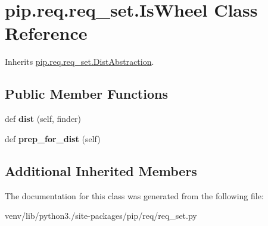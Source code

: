 \hypertarget{classpip_1_1req_1_1req__set_1_1_is_wheel}{}\section{pip.\+req.\+req\+\_\+set.\+Is\+Wheel Class Reference}
\label{classpip_1_1req_1_1req__set_1_1_is_wheel}


Inherits \hyperlink{classpip_1_1req_1_1req__set_1_1_dist_abstraction}{pip.\+req.\+req\+\_\+set.\+Dist\+Abstraction}.

\subsection*{Public Member Functions}
\begin{DoxyCompactItemize}
\item 
\mbox{\label{classpip_1_1req_1_1req__set_1_1_is_wheel_ad3756925831931114fad731e467bf9d8}} 
def {\bfseries dist} (self, finder)
\item 
\mbox{\label{classpip_1_1req_1_1req__set_1_1_is_wheel_ac79dae5fb5d2ecf3e62c24e48accff17}} 
def {\bfseries prep\+\_\+for\+\_\+dist} (self)
\end{DoxyCompactItemize}
\subsection*{Additional Inherited Members}


The documentation for this class was generated from the following file\+:\begin{DoxyCompactItemize}
\item 
venv/lib/python3./site-\/packages/pip/req/req\+\_\+set.\+py\end{DoxyCompactItemize}

